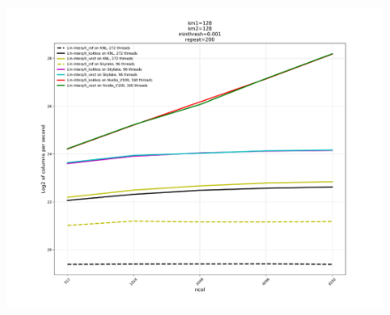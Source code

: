 \documentclass[10pt,twocolumn]{article}
\begin{document}
\begin{figure}[hbt]
  \centering
  \includegraphics[width=1.0\linewidth]{final-total.pdf}
\end{figure}
\end{document}
